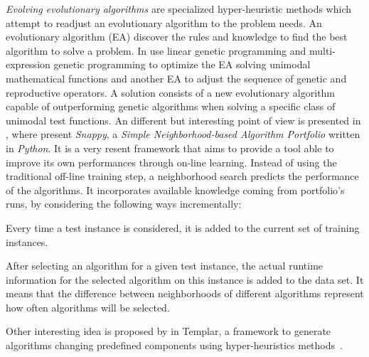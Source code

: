 \textit{Evolving evolutionary algorithms} are specialized hyper-heuristic methods which attempt to readjust an evolutionary algorithm to the problem needs. An evolutionary algorithm (EA) discover the rules and knowledge to find the best algorithm to solve a problem. In \cite{Diosan2009}  use linear genetic programming and multi-expression genetic programming to optimize the EA solving unimodal mathematical functions and another EA to adjust the sequence of genetic and reproductive operators. A solution consists of a new evolutionary algorithm capable of outperforming genetic algorithms when solving a specific class of unimodal test functions. An different but interesting point of view is presented in \cite{Samulowitz2013}, where  present \textit{Snappy}, a \textit{Simple Neighborhood-based Algorithm Portfolio} written in \textit{Python}. It is a very resent framework that aims to provide a tool able to improve its own performances through on-line learning. Instead of using the traditional off-line training step, a neighborhood search predicts the performance of the algorithms. It incorporates available knowledge coming from portfolio's runs, by considering the following ways incrementally: \begin{inparaenum}[1-] \item Every time a test instance is considered, it is added to the current set of training instances. \item After selecting an algorithm for a given test instance, the actual runtime information for the selected algorithm on this instance is added to the data set. It means that the difference between neighborhoods of different algorithms represent how often algorithms will be selected. \end{inparaenum} Other interesting idea is proposed by  in {\sc Templar}, a framework to generate algorithms changing predefined components using hyper-heuristics methods~\cite{Swan2015}.